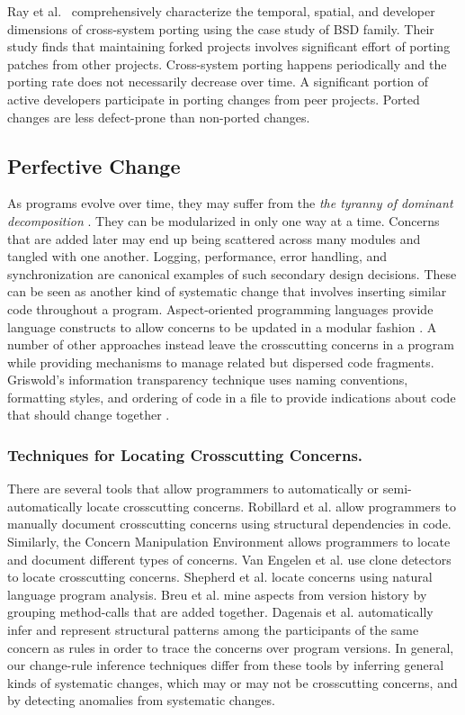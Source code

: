 \documentclass[runningheads,a4paper]{llncs}
\begin{document}
Ray et al.~\cite{Ray2012:FSE} comprehensively characterize the temporal, spatial, and developer dimensions of cross-system porting using the case study of BSD family. Their study finds that maintaining forked projects involves significant effort of porting patches from other projects. Cross-system porting happens periodically and the porting rate does not necessarily decrease over time. A significant portion of active developers participate in porting changes from peer projects. Ported changes are less defect-prone than non-ported changes. 

\subsection{Perfective Change}
\label{sec:perfective}


As programs evolve over time, they may suffer from the {\it the tyranny of dominant decomposition} \cite{Tarr1999}. They can be modularized in only one way at a time. Concerns that are added later may end up being scattered across many modules and tangled with one another.  Logging, performance, error handling, and synchronization are canonical examples of such secondary design decisions.  These can be seen as another kind of systematic change that involves inserting similar code throughout a program.  Aspect-oriented programming languages provide language constructs to allow concerns to be updated in a modular fashion \cite{Kiczales2001:OA}. A number of other approaches instead leave the crosscutting concerns in a program while providing mechanisms to manage related but dispersed code fragments.  Griswold's information transparency technique uses naming conventions, formatting styles, and ordering of code in a file to provide indications about code that should change together \cite{Griswold2001}. 

\subsubsection{Techniques for Locating Crosscutting Concerns.}
There are several tools that allow programmers to automatically or semi-automatically locate crosscutting concerns. Robillard et al. \cite{Robillard2003} allow programmers to manually document crosscutting concerns using structural dependencies in code. Similarly, the Concern Manipulation Environment \cite{Harrison2005} allows programmers to locate and document different types of concerns. 
Van Engelen et al. \cite{VanEngelen2005} use clone detectors to locate crosscutting concerns. Shepherd et al. \cite{Shepherd2007} locate concerns using natural language program analysis.  Breu et al. \cite{Breu2006} mine aspects from version history by grouping method-calls that are added together. Dagenais et al. \cite{Dagenais2007} automatically infer and represent structural patterns among the participants of the same concern as rules in order to trace the concerns over program versions. In general, our change-rule inference techniques differ from these tools by inferring general kinds of systematic changes, which may or may not be crosscutting concerns, and by detecting anomalies from systematic changes. 
\end{document}

